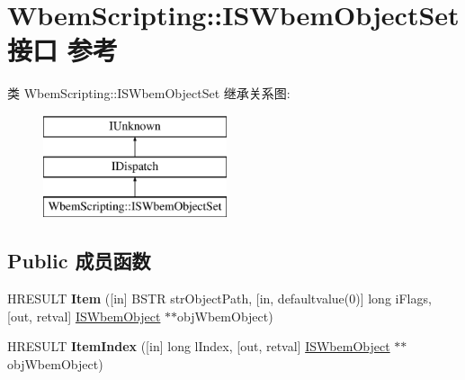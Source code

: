 \hypertarget{interface_wbem_scripting_1_1_i_s_wbem_object_set}{}\section{Wbem\+Scripting\+:\+:I\+S\+Wbem\+Object\+Set接口 参考}
\label{interface_wbem_scripting_1_1_i_s_wbem_object_set}
类 Wbem\+Scripting\+:\+:I\+S\+Wbem\+Object\+Set 继承关系图\+:\begin{figure}[H]
\begin{center}
\leavevmode
\includegraphics[height=3.000000cm]{interface_wbem_scripting_1_1_i_s_wbem_object_set}
\end{center}
\end{figure}
\subsection*{Public 成员函数}
\begin{DoxyCompactItemize}
\item 
\mbox{\label{interface_wbem_scripting_1_1_i_s_wbem_object_set_a45180270b32abc233e1008e363b19166}} 
H\+R\+E\+S\+U\+LT {\bfseries Item} (\mbox{[}in\mbox{]} B\+S\+TR str\+Object\+Path, \mbox{[}in, defaultvalue(0)\mbox{]} long i\+Flags, \mbox{[}out, retval\mbox{]} \hyperlink{interface_wbem_scripting_1_1_i_s_wbem_object}{I\+S\+Wbem\+Object} $\ast$$\ast$obj\+Wbem\+Object)
\item 
\mbox{\label{interface_wbem_scripting_1_1_i_s_wbem_object_set_a9802ab1eac372e2fe337252d4154ee6b}} 
H\+R\+E\+S\+U\+LT {\bfseries Item\+Index} (\mbox{[}in\mbox{]} long l\+Index, \mbox{[}out, retval\mbox{]} \hyperlink{interface_wbem_scripting_1_1_i_s_wbem_object}{I\+S\+Wbem\+Object} $\ast$$\ast$obj\+Wbem\+Object)
\end{DoxyCompactItemize}
